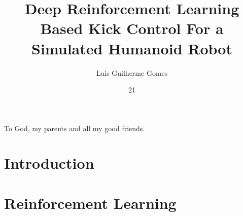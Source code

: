 \documentclass[tg, eng]{ita}    %
\author{Luis Guilherme Gomes}{Aguiar}
\title{Deep Reinforcement Learning Based Kick Control For a Simulated Humanoid Robot}
\date{21}{November}{2018}
\begin{document}
\maketitle

\begin{itadedication}
To God, my parents and all my good friends.
\end{itadedication}

\begin{itathanks}

\end{itathanks}


\begin{abstract}
\noindent

\end{abstract}

\begin{englishabstract}
\noindent

\end{englishabstract}

\listoffigures %


\listofabbreviations

\listofsymbols

\tableofcontents

\mainmatter

\chapter{Introduction}
\label{chap:introduction}


\chapter{Reinforcement Learning}
\label{chap:rl}

\end{document}
